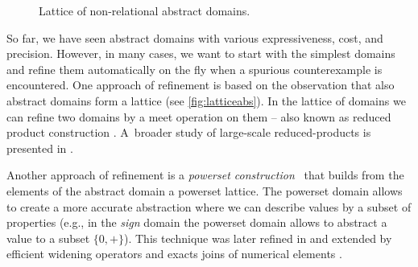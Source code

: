 \begin{figure}%
    \centering
    \caption{Lattice of non-relational abstract domains.}
    \label{fig:latticeabs}%
\end{figure}%

So far, we have seen abstract domains with various expressiveness, cost, and
precision. However, in many cases, we want to start with the simplest domains
and refine them automatically on the fly when a spurious counterexample is
encountered. One approach of refinement is based on the observation that
also abstract domains form a lattice (see \autoref{fig:latticeabs}). In the lattice
of domains we can refine two domains by a meet operation on them -- also known
as reduced product construction \cite{Toubhans2013, Cousot2011b}. A~broader
study of large-scale reduced-products is presented in \cite{Cousot2007}.

Another approach of refinement is a \emph{powerset construction}~\cite{Cousot1979}
that builds from the elements of the abstract domain a powerset lattice. The
powerset domain allows to create a more accurate abstraction where we can
describe values by a subset of properties (e.g., in the \textit{sign} domain
the powerset domain allows to abstract a value to a subset $\{0, +\}$).  This
technique was later refined in \cite{File1999} and extended by efficient
widening operators \cite{Bagnara2004} and exacts joins of numerical elements
\cite{Bagnara2010}.

